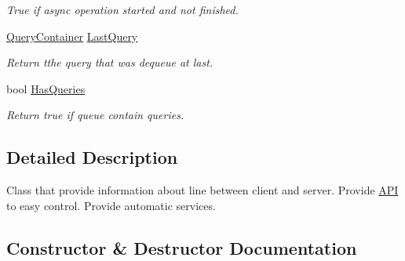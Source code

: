 \begin{DoxyCompactItemize}
\begin{DoxyCompactList}\small\item\em True if async operation started and not finished. \end{DoxyCompactList}\item 
\mbox{\hyperlink{struct_pipes_provider_1_1_query_container}{Query\+Container}} \mbox{\hyperlink{class_pipes_provider_1_1_transmission_line_a3cc3f03332be99b5f380772587ca2883}{Last\+Query}}
\begin{DoxyCompactList}\small\item\em Return tthe query that was dequeue at last. \end{DoxyCompactList}\item 
bool \mbox{\hyperlink{class_pipes_provider_1_1_transmission_line_a39f81c072ca65efd260d02fc7d5c5458}{Has\+Queries}}
\begin{DoxyCompactList}\small\item\em Return true if queue contain queries. \end{DoxyCompactList}\end{DoxyCompactItemize}


\subsection{Detailed Description}
Class that provide information about line between client and server. Provide \mbox{\hyperlink{class_pipes_provider_1_1_a_p_i}{A\+PI}} to easy control. Provide automatic services. 



\subsection{Constructor \& Destructor Documentation}
\mbox{\label{class_pipes_provider_1_1_transmission_line_a20398f48516f0fc5fe0700b01b7fc6d7}} 
